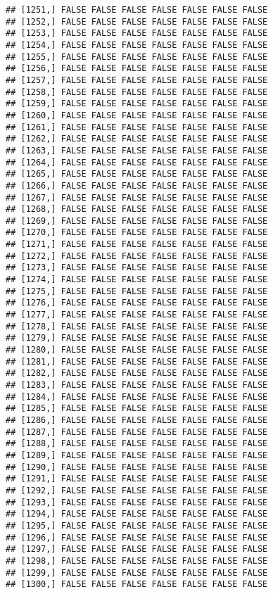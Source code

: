 \documentclass[
]{article}
\begin{document}
\begin{verbatim}
## [1251,] FALSE FALSE FALSE FALSE FALSE FALSE FALSE
## [1252,] FALSE FALSE FALSE FALSE FALSE FALSE FALSE
## [1253,] FALSE FALSE FALSE FALSE FALSE FALSE FALSE
## [1254,] FALSE FALSE FALSE FALSE FALSE FALSE FALSE
## [1255,] FALSE FALSE FALSE FALSE FALSE FALSE FALSE
## [1256,] FALSE FALSE FALSE FALSE FALSE FALSE FALSE
## [1257,] FALSE FALSE FALSE FALSE FALSE FALSE FALSE
## [1258,] FALSE FALSE FALSE FALSE FALSE FALSE FALSE
## [1259,] FALSE FALSE FALSE FALSE FALSE FALSE FALSE
## [1260,] FALSE FALSE FALSE FALSE FALSE FALSE FALSE
## [1261,] FALSE FALSE FALSE FALSE FALSE FALSE FALSE
## [1262,] FALSE FALSE FALSE FALSE FALSE FALSE FALSE
## [1263,] FALSE FALSE FALSE FALSE FALSE FALSE FALSE
## [1264,] FALSE FALSE FALSE FALSE FALSE FALSE FALSE
## [1265,] FALSE FALSE FALSE FALSE FALSE FALSE FALSE
## [1266,] FALSE FALSE FALSE FALSE FALSE FALSE FALSE
## [1267,] FALSE FALSE FALSE FALSE FALSE FALSE FALSE
## [1268,] FALSE FALSE FALSE FALSE FALSE FALSE FALSE
## [1269,] FALSE FALSE FALSE FALSE FALSE FALSE FALSE
## [1270,] FALSE FALSE FALSE FALSE FALSE FALSE FALSE
## [1271,] FALSE FALSE FALSE FALSE FALSE FALSE FALSE
## [1272,] FALSE FALSE FALSE FALSE FALSE FALSE FALSE
## [1273,] FALSE FALSE FALSE FALSE FALSE FALSE FALSE
## [1274,] FALSE FALSE FALSE FALSE FALSE FALSE FALSE
## [1275,] FALSE FALSE FALSE FALSE FALSE FALSE FALSE
## [1276,] FALSE FALSE FALSE FALSE FALSE FALSE FALSE
## [1277,] FALSE FALSE FALSE FALSE FALSE FALSE FALSE
## [1278,] FALSE FALSE FALSE FALSE FALSE FALSE FALSE
## [1279,] FALSE FALSE FALSE FALSE FALSE FALSE FALSE
## [1280,] FALSE FALSE FALSE FALSE FALSE FALSE FALSE
## [1281,] FALSE FALSE FALSE FALSE FALSE FALSE FALSE
## [1282,] FALSE FALSE FALSE FALSE FALSE FALSE FALSE
## [1283,] FALSE FALSE FALSE FALSE FALSE FALSE FALSE
## [1284,] FALSE FALSE FALSE FALSE FALSE FALSE FALSE
## [1285,] FALSE FALSE FALSE FALSE FALSE FALSE FALSE
## [1286,] FALSE FALSE FALSE FALSE FALSE FALSE FALSE
## [1287,] FALSE FALSE FALSE FALSE FALSE FALSE FALSE
## [1288,] FALSE FALSE FALSE FALSE FALSE FALSE FALSE
## [1289,] FALSE FALSE FALSE FALSE FALSE FALSE FALSE
## [1290,] FALSE FALSE FALSE FALSE FALSE FALSE FALSE
## [1291,] FALSE FALSE FALSE FALSE FALSE FALSE FALSE
## [1292,] FALSE FALSE FALSE FALSE FALSE FALSE FALSE
## [1293,] FALSE FALSE FALSE FALSE FALSE FALSE FALSE
## [1294,] FALSE FALSE FALSE FALSE FALSE FALSE FALSE
## [1295,] FALSE FALSE FALSE FALSE FALSE FALSE FALSE
## [1296,] FALSE FALSE FALSE FALSE FALSE FALSE FALSE
## [1297,] FALSE FALSE FALSE FALSE FALSE FALSE FALSE
## [1298,] FALSE FALSE FALSE FALSE FALSE FALSE FALSE
## [1299,] FALSE FALSE FALSE FALSE FALSE FALSE FALSE
## [1300,] FALSE FALSE FALSE FALSE FALSE FALSE FALSE

\end{verbatim}
\end{document}
